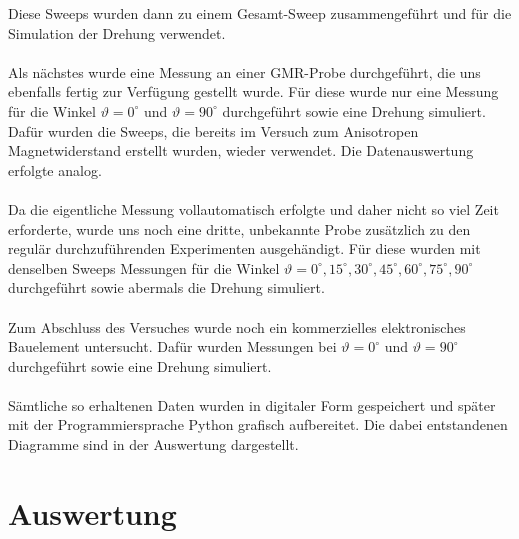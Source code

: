 \documentclass[german,  %
parskip=full,  %
]{scrartcl}
\begin{document}
Diese Sweeps wurden dann zu einem Gesamt-Sweep zusammengeführt und für die Simulation der Drehung verwendet. \\\\
Als nächstes wurde eine Messung an einer GMR-Probe durchgeführt, die uns ebenfalls fertig zur Verfügung gestellt wurde. Für diese wurde nur eine Messung für die Winkel \(\vartheta=0^{\circ}\) und \(\vartheta=90^{\circ}\) durchgeführt sowie eine Drehung simuliert. Dafür wurden die Sweeps, die bereits im Versuch zum Anisotropen Magnetwiderstand erstellt wurden, wieder verwendet. Die Datenauswertung erfolgte analog. \\\\
Da die eigentliche Messung vollautomatisch erfolgte und daher nicht so viel Zeit erforderte, wurde uns noch eine dritte, unbekannte Probe zusätzlich zu den regulär durchzuführenden Experimenten ausgehändigt. Für diese wurden mit denselben Sweeps Messungen für die Winkel \(\vartheta=0^{\circ},15^{\circ},30^{\circ},45^{\circ},60^{\circ},75^{\circ},90^{\circ}\) durchgeführt sowie abermals die Drehung simuliert. \\\\
Zum Abschluss des Versuches wurde noch ein kommerzielles elektronisches Bauelement untersucht. Dafür wurden Messungen bei \(\vartheta=0^{\circ}\) und \(\vartheta=90^{\circ}\) durchgeführt sowie eine Drehung simuliert. \\\\
Sämtliche so erhaltenen Daten wurden in digitaler Form gespeichert und später mit der Programmiersprache Python grafisch aufbereitet. Die dabei entstandenen Diagramme sind in der Auswertung dargestellt.
\section{Auswertung}
\end{document}

